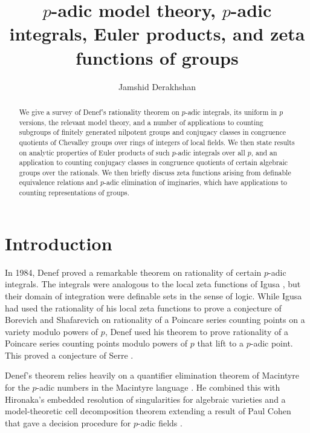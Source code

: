 \documentclass[12pt]{amsart}
\title[$p$-adic integrals, Euler products, and zeta functions]{$p$-adic model theory, $p$-adic integrals, Euler products, and zeta functions of groups}
\author[J. Derakhshan]{Jamshid Derakhshan}
\numberwithin{equation}{section}
\begin{document}
\keywords{}

    
  

\begin{abstract} 
We give a survey of Denef's rationality theorem on $p$-adic integrals, its uniform in $p$ versions, the relevant model theory, and a number of applications to counting subgroups of finitely generated nilpotent groups and conjugacy classes in congruence quotients of Chevalley groups over rings of integers of local fields. We then state results on analytic properties of 
Euler products of such $p$-adic integrals over all $p$, and an application to counting conjugacy classes in congruence quotients of certain algebraic groups over the rationals. 
We then briefly discuss zeta functions arising from definable equivalence relations and $p$-adic elimination of imginaries, which have applications to counting representations of groups.


\end{abstract}

\maketitle



\tableofcontents


\section{\bf Introduction}\label{sec-introduction}
In 1984, Denef \cite{Denefrationality} 
proved a remarkable theorem on rationality of certain $p$-adic integrals. The integrals were analogous to the local zeta functions of Igusa \cite{igusa-book}, but their domain of integration were definable sets in the sense of logic. While 
Igusa had used the rationality of his local zeta functions to prove a conjecture of Borevich and Shafarevich on rationality of 
a Poincare series counting points on a variety modulo powers of $p$, Denef used his theorem to prove rationality of a 
Poincare series counting points modulo powers of $p$ that lift to a $p$-adic point. This proved a conjecture of Serre \cite{serre-conj}. 

Denef's theorem relies heavily on a quantifier elimination theorem of Macintyre for the $p$-adic numbers in the Macintyre language \cite{Macintyre1}. He combined this with Hironaka's embedded resolution of singularities for algebraic varieties and a model-theoretic cell decomposition theorem extending a result of Paul Cohen that gave a decision procedure for $p$-adic fields \cite{Cohen}. 
\end{document}
